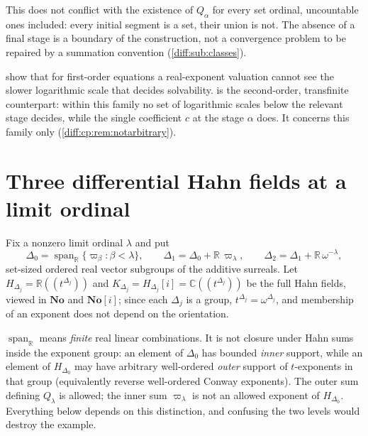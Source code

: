 \documentclass[11pt,letterpaper]{article}
\numberwithin{equation}{section}
\theoremstyle{definition}
\theoremstyle{remark}
\newcommand{\No}{\mathbf{No}}
\newcommand{\SC}{\mathbf{No}[i]}
\newcommand{\R}{\mathbb R}
\newcommand{\C}{\mathbb C}
\newcommand{\Span}{\operatorname{span}}
\begin{document}
This does not conflict with the existence of $Q_{\alpha}$ for every set
ordinal, uncountable ones included: every initial segment is a set, their
union is not. The absence of a final stage is a boundary of the construction,
not a convergence problem to be repaired by a summation convention
(\cref{diff:sub:classes}).

\begin{remark}
\label{diff:cp:rem:separator}
 show that for first-order
equations a real-exponent valuation cannot see the slower logarithmic scale
that decides solvability.  is the second-order,
transfinite counterpart: within this family no set of logarithmic scales
below the relevant stage decides, while the single coefficient $c$ at the
stage $\alpha$ does. It concerns this family only
(\cref{diff:cp:rem:notarbitrary}).
\end{remark}

\section{Three differential Hahn fields at a limit ordinal}
\label{diff:cp:sec:fields}

Fix a nonzero limit ordinal $\lambda$ and put
\begin{equation}\label{diff:cp:eq:groups}
 \Delta_{0}=\Span_{\R}\{\varpi_{\beta}:\beta<\lambda\},\qquad
 \Delta_{1}=\Delta_{0}+\R\,\varpi_{\lambda},\qquad
 \Delta_{2}=\Delta_{1}+\R\,\omega^{-\lambda},
\end{equation}
set-sized ordered real vector subgroups of the additive surreals. Let
$H_{\Delta_{j}}=\R((t^{\Delta_{j}}))$ and $K_{\Delta_{j}}=H_{\Delta_{j}}[i]
=\C((t^{\Delta_{j}}))$ be the full Hahn fields, viewed in $\No$ and $\SC$;
since each $\Delta_{j}$ is a group, $t^{\Delta_{j}}=\omega^{\Delta_{j}}$, and
membership of an exponent does not depend on the orientation.

\begin{warning}
\label{diff:cp:warn:supports}
$\Span_{\R}$ means \emph{finite} real linear combinations. It is not closure
under Hahn sums inside the exponent group: an element of $\Delta_{0}$ has
bounded \emph{inner} support, while an element of $H_{\Delta_{0}}$ may have
arbitrary well-ordered \emph{outer} support of $t$-exponents in
that group (equivalently reverse well-ordered Conway exponents). The
outer sum defining $Q_{\lambda}$ is allowed; the inner sum $\varpi_{\lambda}$ is
not an allowed exponent of $H_{\Delta_{0}}$. Everything below depends on this
distinction, and confusing the two levels would destroy the example.
\end{warning}
\end{document}
